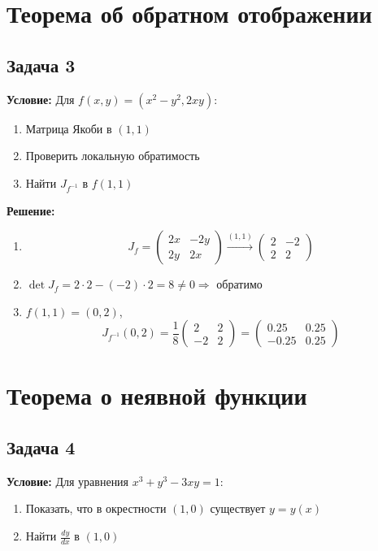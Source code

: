 \documentclass{article}
\begin{document}
\section*{Теорема об обратном отображении}

\subsection*{Задача 3}
\textbf{Условие:} Для \(f(x,y) = (x^2 - y^2, 2xy)\):
\begin{enumerate}
\item Матрица Якоби в \((1,1)\)
\item Проверить локальную обратимость
\item Найти \(J_{f^{-1}}\) в \(f(1,1)\)
\end{enumerate}

\textbf{Решение:}
\begin{enumerate}
\item 
\[
J_f = \begin{pmatrix}
2x & -2y \\
2y & 2x
\end{pmatrix} \xrightarrow{(1,1)} \begin{pmatrix}
2 & -2 \\
2 & 2
\end{pmatrix}
\]

\item \(\det J_f = 2\cdot2 - (-2)\cdot2 = 8 \neq 0 \Rightarrow\) обратимо

\item \(f(1,1) = (0,2)\),
\[
J_{f^{-1}}(0,2) = \frac{1}{8}\begin{pmatrix}
2 & 2 \\
-2 & 2
\end{pmatrix} = \begin{pmatrix}
0.25 & 0.25 \\
-0.25 & 0.25
\end{pmatrix}
\]
\end{enumerate}

\section*{Теорема о неявной функции}

\subsection*{Задача 4}
\textbf{Условие:} Для уравнения \(x^3 + y^3 - 3xy = 1\):
\begin{enumerate}
\item Показать, что в окрестности \((1,0)\) существует \(y = y(x)\)
\item Найти \(\frac{dy}{dx}\) в \((1,0)\)
\end{enumerate}
\end{document}
